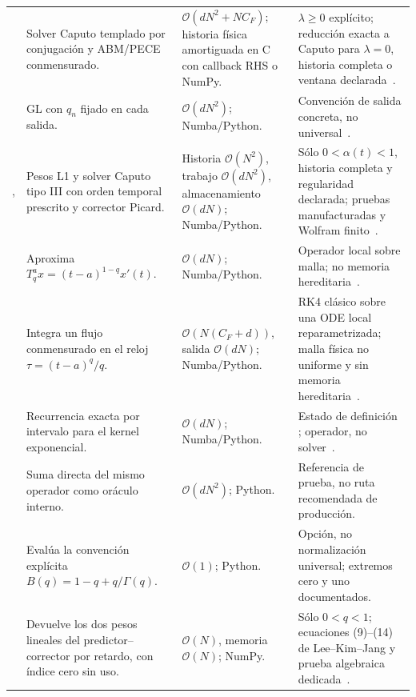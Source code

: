 \begin{center}
\begin{longtable}{@{}L{0.23\textwidth}L{0.23\textwidth}L{0.23\textwidth}L{0.23\textwidth}@{}}
\addlinespace
{} & Solver Caputo templado por conjugación y ABM/PECE conmensurado. & \(\mathcal O(dN^2+NC_F)\); historia física amortiguada en C con callback RHS o NumPy. & \(\lambda\ge0\) explícito; reducción exacta a Caputo para \(\lambda=0\), historia completa o ventana declarada~\cite{LiDengZhao2019}. \\
\addlinespace
{} & GL con \(q_n\) fijado en cada salida. & \(\mathcal O(dN^2)\); Numba/Python. & Convención de salida concreta, no universal~\cite{SamkoRoss1993}. \\
\addlinespace
{},  & Pesos L1 y solver Caputo tipo III con orden temporal prescrito y corrector Picard. & Historia \(\mathcal O(N^2)\), trabajo \(\mathcal O(dN^2)\), almacenamiento \(\mathcal O(dN)\); Numba/Python. & Sólo \(0<\alpha(t)<1\), historia completa y regularidad declarada; pruebas manufacturadas y Wolfram finito~\cite{TavaresEtAl2016,FangEtAl2020}. \\
\addlinespace
{} & Aproxima \(T_q^a x=(t-a)^{1-q}x'(t)\). & \(\mathcal O(dN)\); Numba/Python. & Operador local sobre malla; no memoria hereditaria~\cite{KhalilEtAl2014}. \\
\addlinespace
{} & Integra un flujo conmensurado en el reloj \(\tau=(t-a)^q/q\). & \(\mathcal O(N(C_F+d))\), salida \(\mathcal O(dN)\); Numba/Python. & RK4 clásico sobre una ODE local reparametrizada; malla física no uniforme y sin memoria hereditaria~\cite{KhalilEtAl2014}. \\
\addlinespace
{} & Recurrencia exacta por intervalo para el kernel exponencial. & \(\mathcal O(dN)\); Numba/Python. & Estado de definición ; operador, no solver~\cite{CaputoFabrizio2015,DiethelmEtAl2020}. \\
\addlinespace
{} & Suma directa del mismo operador como oráculo interno. & \(\mathcal O(dN^2)\); Python. & Referencia de prueba, no ruta recomendada de producción. \\
\addlinespace
{} & Evalúa la convención explícita \(B(q)=1-q+q/\Gamma(q)\). & \(\mathcal O(1)\); Python. & Opción, no normalización universal; extremos cero y uno documentados. \\
\addlinespace
{} & Devuelve los dos pesos lineales del predictor--corrector por retardo, con índice cero sin uso. & \(\mathcal O(N)\), memoria \(\mathcal O(N)\); NumPy. & Sólo \(0<q<1\); ecuaciones (9)--(14) de Lee--Kim--Jang y prueba algebraica dedicada~\cite{LeeKimJang2024}. \\

\end{longtable}
\end{center}

